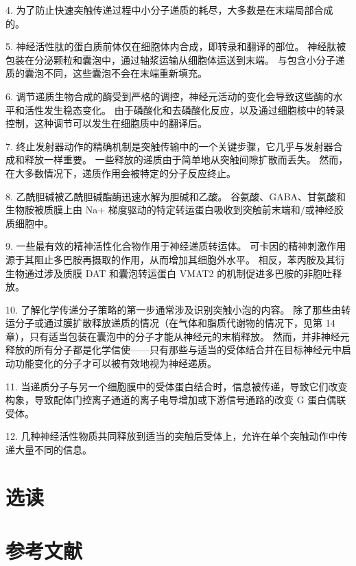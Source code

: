 4. 为了防止快速突触传递过程中小分子递质的耗尽，大多数是在末端局部合成的。 

5. 神经活性肽的蛋白质前体仅在细胞体内合成，即转录和翻译的部位。 神经肽被包装在分泌颗粒和囊泡中，通过轴浆运输从细胞体运送到末端。 与包含小分子递质的囊泡不同，这些囊泡不会在末端重新填充。 

6. 调节递质生物合成的酶受到严格的调控，神经元活动的变化会导致这些酶的水平和活性发生稳态变化。 由于磷酸化和去磷酸化反应，以及通过细胞核中的转录控制，这种调节可以发生在细胞质中的翻译后。 

7. 终止发射器动作的精确机制是突触传输中的一个关键步骤，它几乎与发射器合成和释放一样重要。 一些释放的递质由于简单地从突触间隙扩散而丢失。 然而，在大多数情况下，递质作用会被特定的分子反应终止。 

8. 乙酰胆碱被乙酰胆碱酯酶迅速水解为胆碱和乙酸。 谷氨酸、GABA、甘氨酸和生物胺被质膜上由 Na+ 梯度驱动的特定转运蛋白吸收到突触前末端和/或神经胶质细胞中。 

9. 一些最有效的精神活性化合物作用于神经递质转运体。 可卡因的精神刺激作用源于其阻止多巴胺再摄取的作用，从而增加其细胞外水平。 相反，苯丙胺及其衍生物通过涉及质膜 DAT 和囊泡转运蛋白 VMAT2 的机制促进多巴胺的非胞吐释放。 

10. 了解化学传递分子策略的第一步通常涉及识别突触小泡的内容。 除了那些由转运分子或通过膜扩散释放递质的情况（在气体和脂质代谢物的情况下，见第 14 章），只有适当包装在囊泡中的分子才能从神经元的末梢释放。 然而，并非神经元释放的所有分子都是化学信使——只有那些与适当的受体结合并在目标神经元中启动功能变化的分子才可以被有效地视为神经递质。 

11. 当递质分子与另一个细胞膜中的受体蛋白结合时，信息被传递，导致它们改变构象，导致配体门控离子通道的离子电导增加或下游信号通路的改变 G 蛋白偶联受体。 

12. 几种神经活性物质共同释放到适当的突触后受体上，允许在单个突触动作中传递大量不同的信息。

\section{选读}

\section{参考文献}